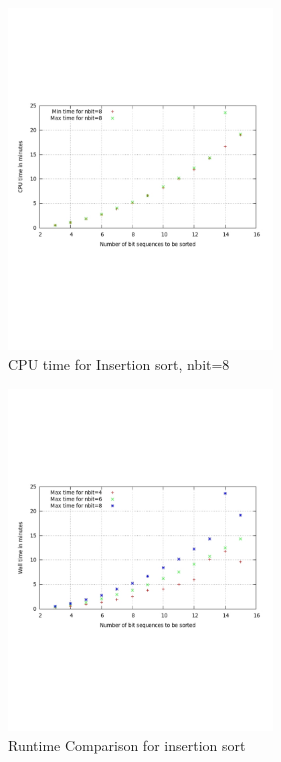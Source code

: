 \documentclass{acm_proc_article-sp}
\begin{document}
\begin{figure}[!H]%
\centering
\includegraphics[width=7cm]{fsort7.pdf} 
\caption{CPU time for Insertion sort, nbit=8} 
\label{fig:image_sf7} %
\end{figure}

\begin{figure}[!H]
\centering
\includegraphics[width=7cm]{fsort2.pdf} 
\caption{Runtime Comparison for insertion sort} 
\label{fig:image_sf2} %
\end{figure}
\end{document}
